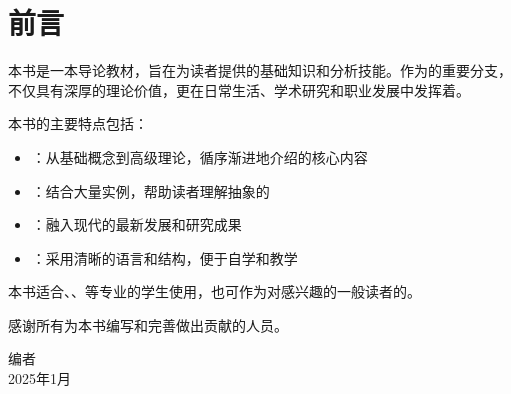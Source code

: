 \chapter*{前言}

\begin{logicbox}[title=引言]
本书是一本导论教材，旨在为读者提供的基础知识和分析技能。作为的重要分支，不仅具有深厚的理论价值，更在日常生活、学术研究和职业发展中发挥着。
\end{logicbox}

本书的主要特点包括：

\begin{itemize}
\item {}：从基础概念到高级理论，循序渐进地介绍的核心内容
\item {}：结合大量实例，帮助读者理解抽象的
\item {}：融入现代的最新发展和研究成果
\item {}：采用清晰的语言和结构，便于自学和教学
\end{itemize}

本书适合、、等专业的学生使用，也可作为对感兴趣的一般读者的。

感谢所有为本书编写和完善做出贡献的人员。

\vspace{1cm}
\begin{flushright}
编者\\
2025年1月
\end{flushright}

